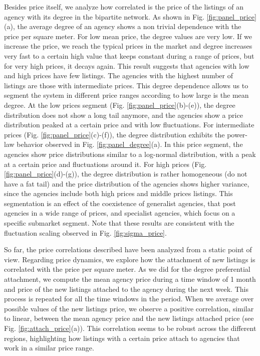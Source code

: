 Besides price itself, we analyze how correlated is the price of the listings of an agency with its degree in the bipartite network. As shown in Fig. \ref{fig:panel_price}(a), the average degree of an agency shows a non trivial dependence with the price per square meter. For low mean price, the degree values are very low. If we increase the price, we reach the typical prices in the market and degree increases very fast to a certain high value that keeps constant during a range of prices, but for very high prices, it decays again. This result suggests that agencies with low and high prices have few listings. The agencies with the highest number of listings are those with intermediate prices. This degree dependence allows us to segment the system in different price ranges according to how large is the mean degree. At the low prices segment (Fig. \ref{fig:panel_price}(b)-(e)), the degree distribution does not show a long tail anymore, and the agencies show a price distribution peaked at a certain price and with low fluctuations. For intermediate prices (Fig. \ref{fig:panel_price}(c)-(f)), the degree distribution exhibits the power-law behavior observed in Fig. \ref{fig:panel_degree}(a). In this price segment, the agencies show price distributions similar to a log-normal distribution, with a peak at a certain price and fluctuations around it. For high prices (Fig. \ref{fig:panel_price}(d)-(g)), the degree distribution is rather homogeneous (do not have a fat tail) and the price distribution of the agencies shows higher variance, since the agencies include both high prices and middle prices listings. This segmentation is an effect of the coexistence of generalist agencies, that post agencies in a wide range of prices, and specialist agencies, which focus on a specific submarket segment. Note that these results are consistent with the fluctuation scaling observed in Fig. \ref{fig:sigma_price}. 

So far, the price correlations described have been analyzed from a static point of view. Regarding price dynamics, we explore how the attachment of new listings is correlated with the price per square meter. As we did for the degree preferential attachment, we compute the mean agency price during a time window of 1 month and price of the new listings attached to the agency during the next week. This process is repeated for all the time windows in the period. When we average over possible values of the new listings price, we observe a positive correlation, similar to linear, between the mean agency price and the new listings attached price (see Fig. \ref{fig:attach_price}(a)). This correlation seems to be robust across the different regions, highlighting how listings with a certain price attach to agencies that work in a similar price range.

